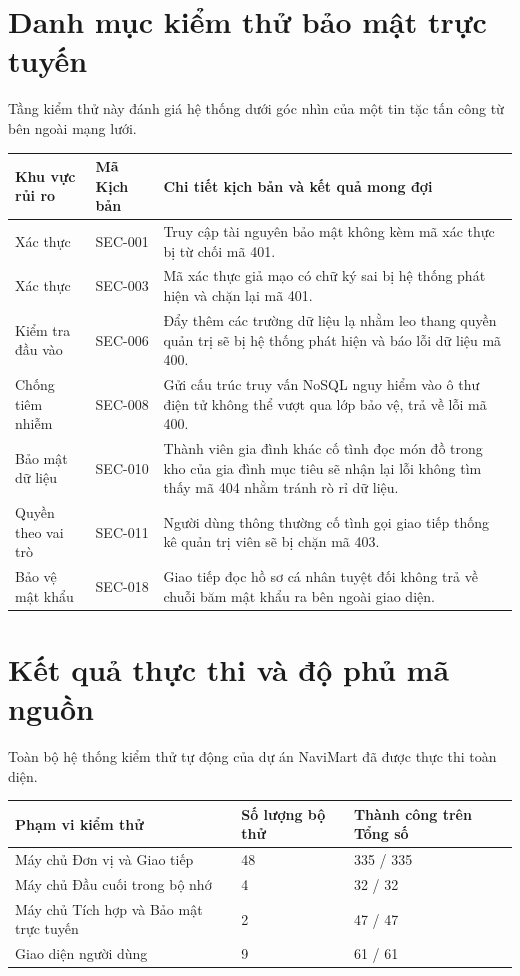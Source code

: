\documentclass[../main.tex]{subfiles}
\begin{document}
\section{Danh mục kiểm thử bảo mật trực tuyến}
Tầng kiểm thử này đánh giá hệ thống dưới góc nhìn của một tin tặc tấn công từ bên ngoài mạng lưới.

\begin{longtable}{|p{}|p{}|p{}|}
\hline
\textbf{Khu vực rủi ro} & \textbf{Mã Kịch bản} & \textbf{Chi tiết kịch bản và kết quả mong đợi} \\
\hline
Xác thực & SEC-001 & Truy cập tài nguyên bảo mật không kèm mã xác thực bị từ chối mã 401. \\
\hline
Xác thực & SEC-003 & Mã xác thực giả mạo có chữ ký sai bị hệ thống phát hiện và chặn lại mã 401. \\
\hline
Kiểm tra đầu vào & SEC-006 & Đẩy thêm các trường dữ liệu lạ nhằm leo thang quyền quản trị sẽ bị hệ thống phát hiện và báo lỗi dữ liệu mã 400. \\
\hline
Chống tiêm nhiễm & SEC-008 & Gửi cấu trúc truy vấn NoSQL nguy hiểm vào ô thư điện tử không thể vượt qua lớp bảo vệ, trả về lỗi mã 400. \\
\hline
Bảo mật dữ liệu & SEC-010 & Thành viên gia đình khác cố tình đọc món đồ trong kho của gia đình mục tiêu sẽ nhận lại lỗi không tìm thấy mã 404 nhằm tránh rò rỉ dữ liệu. \\
\hline
Quyền theo vai trò & SEC-011 & Người dùng thông thường cố tình gọi giao tiếp thống kê quản trị viên sẽ bị chặn mã 403. \\
\hline
Bảo vệ mật khẩu & SEC-018 & Giao tiếp đọc hồ sơ cá nhân tuyệt đối không trả về chuỗi băm mật khẩu ra bên ngoài giao diện. \\
\hline
\end{longtable}

\section{Kết quả thực thi và độ phủ mã nguồn}

Toàn bộ hệ thống kiểm thử tự động của dự án NaviMart đã được thực thi toàn diện.

\begin{longtable}{|p{}|p{}|p{}|}
\hline
\textbf{Phạm vi kiểm thử} & \textbf{Số lượng bộ thử} & \textbf{Thành công trên Tổng số} \\
\hline
Máy chủ Đơn vị và Giao tiếp & 48 & 335 / 335 \\
\hline
Máy chủ Đầu cuối trong bộ nhớ & 4 & 32 / 32 \\
\hline
Máy chủ Tích hợp và Bảo mật trực tuyến & 2 & 47 / 47 \\
\hline
Giao diện người dùng & 9 & 61 / 61 \\
\hline
\end{longtable}
\end{document}
